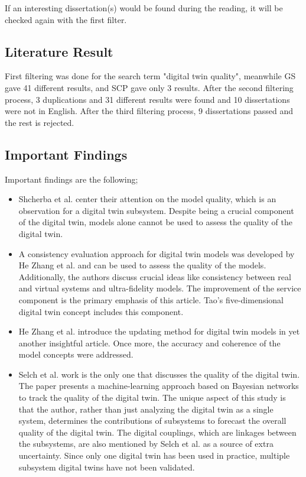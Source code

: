 \documentclass[9pt,conference]{IEEEtran}
\begin{document}
    If an interesting dissertation(s) would be found during the reading, it will be checked again with the first filter.

    \subsection*{Literature Result}
    First filtering was done for the search term "digital twin quality", meanwhile GS gave 41 different results, and SCP gave only 3 results. After the second filtering process, 3 duplications and 31 different results were found and 10 dissertations were not in English. 
    After the third filtering process, 9 dissertations passed and the rest is rejected.

    \subsection*{Important Findings}

    Important findings are the following;

    \begin{itemize}
        \item Shcherba et al. center their attention on the model quality, which is an observation for a digital twin subsystem. Despite being a crucial component of the digital twin, models alone cannot be used to assess the quality of the digital twin.
        \item A consistency evaluation approach for digital twin models was developed by He Zhang et al. and can be used to assess the quality of the models. Additionally, the authors discuss crucial ideas like consistency between real and virtual systems and ultra-fidelity models. The improvement of the service component is the primary emphasis of this article. Tao's five-dimensional digital twin concept includes this component.
        \item He Zhang et al. introduce the updating method for digital twin models in yet another insightful article. Once more, the accuracy and coherence of the model concepts were addressed.
        \item Selch et al. work is the only one that discusses the quality of the digital twin. The paper presents a machine-learning approach based on Bayesian networks to track the quality of the digital twin. The unique aspect of this study is that the author, rather than just analyzing the digital twin as a single system, determines the contributions of subsystems to forecast the overall quality of the digital twin. The digital couplings, which are linkages between the subsystems, are also mentioned by Selch et al. as a source of extra uncertainty. 
        Since only one digital twin has been used in practice, multiple subsystem digital twins have not been validated.
    \end{itemize}
\end{document}
